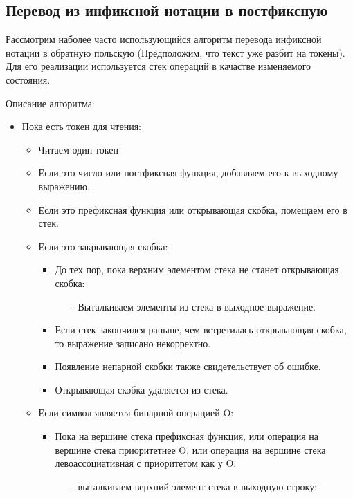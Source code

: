 \subsection{Перевод из инфиксной нотации в постфиксную}
Рассмотрим наболее часто использующийся алгоритм перевода инфиксной нотации в 
обратную польскую (Предположим, что текст уже разбит на токены). Для его реализации
используется стек операций в качастве изменяемого состояния.

Описание алгоритма:
\begin{itemize}
  \item Пока есть токен для чтения:
    \begin{itemize}
      \item Читаем один токен
      \item Если это число или постфиксная функция, добавляем его к выходному выражению.
      \item Если это префиксная функция или открывающая скобка, помещаем его в стек.
      \item Если это закрывающая скобка:
        \begin{itemize}
          \item До тех пор, пока верхним элементом стека не станет открывающая 
            скобка:
            \begin{itemize}
              \item[-] Выталкиваем элементы из стека в выходное выражение. 
            \end{itemize}
          \item Если стек закончился раньше, чем встретилась открывающая 
            скобка, то выражение записано некорректно.
          \item Появление непарной скобки также свидетельствует об ошибке.
          \item Открывающая скобка удаляется из стека. 
        \end{itemize}
      \item Если символ является бинарной операцией O:
        \begin{itemize}
          \item 
            Пока на вершине стека префиксная функция,
            или операция на вершине стека приоритетнее O,
            или операция на вершине стека левоассоциативная с приоритетом как у O:
            \begin{itemize}
              \item[-] выталкиваем верхний элемент стека в выходную строку;
            \end{itemize}

\end{itemize}
\end{itemize}
\end{itemize}
